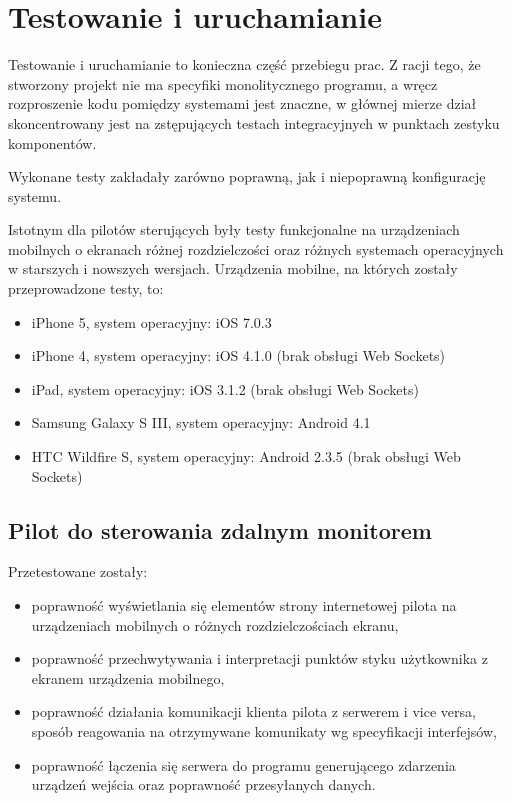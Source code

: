 \newpage
\section{Testowanie i uruchamianie}

Testowanie i uruchamianie to konieczna część przebiegu prac. Z racji tego, że stworzony projekt nie ma specyfiki monolitycznego programu, a wręcz rozproszenie kodu pomiędzy systemami jest znaczne, w głównej mierze dział skoncentrowany jest na  zstępujących testach integracyjnych w punktach zestyku komponentów.

Wykonane testy zakładały zarówno poprawną, jak i niepoprawną konfigurację systemu.

Istotnym dla pilotów sterujących były testy funkcjonalne na urządzeniach mobilnych o ekranach różnej rozdzielczości oraz różnych systemach operacyjnych w starszych i nowszych wersjach. Urządzenia mobilne, na których zostały przeprowadzone testy, to:
\begin{itemize}
	\item iPhone 5, system operacyjny: iOS 7.0.3
	\item iPhone 4, system operacyjny: iOS 4.1.0 (brak obsługi Web Sockets)
	\item iPad, system operacyjny: iOS 3.1.2 (brak obsługi Web Sockets)
	\item Samsung Galaxy S III, system operacyjny: Android 4.1
	\item HTC Wildfire S, system operacyjny: Android 2.3.5 (brak obsługi Web Sockets)
\end{itemize}

\subsection{Pilot do sterowania zdalnym monitorem}

Przetestowane zostały:

\begin{itemize}
	\item poprawność wyświetlania się elementów strony internetowej pilota na urządzeniach mobilnych o różnych rozdzielczościach ekranu,
	\item poprawność przechwytywania i interpretacji punktów styku użytkownika z ekranem urządzenia mobilnego,
	\item poprawność działania komunikacji klienta pilota z serwerem i vice versa, sposób reagowania na otrzymywane komunikaty wg specyfikacji interfejsów,
	\item poprawność łączenia się serwera do programu generującego zdarzenia urządzeń wejścia oraz poprawność przesyłanych danych.
\end{itemize}


